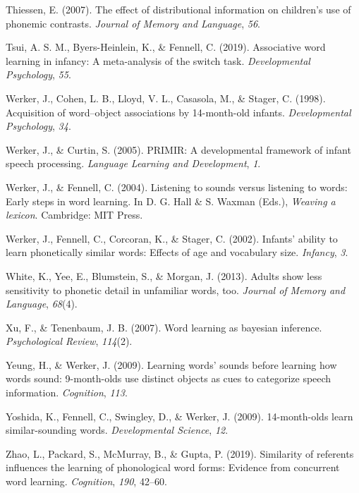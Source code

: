 \documentclass[english,,man]{apa6}
\begin{document}
\leavevmode\hypertarget{ref-thiessen2007}{}%
Thiessen, E. (2007). The effect of distributional information on children's use of phonemic contrasts. \emph{Journal of Memory and Language}, \emph{56}.

\leavevmode\hypertarget{ref-tsui2019}{}%
Tsui, A. S. M., Byers-Heinlein, K., \& Fennell, C. (2019). Associative word learning in infancy: A meta-analysis of the switch task. \emph{Developmental Psychology}, \emph{55}.

\leavevmode\hypertarget{ref-werker1998}{}%
Werker, J., Cohen, L. B., Lloyd, V. L., Casasola, M., \& Stager, C. (1998). Acquisition of word--object associations by 14-month-old infants. \emph{Developmental Psychology}, \emph{34}.

\leavevmode\hypertarget{ref-werker2005}{}%
Werker, J., \& Curtin, S. (2005). PRIMIR: A developmental framework of infant speech processing. \emph{Language Learning and Development}, \emph{1}.

\leavevmode\hypertarget{ref-werker2004}{}%
Werker, J., \& Fennell, C. (2004). Listening to sounds versus listening to words: Early steps in word learning. In D. G. Hall \& S. Waxman (Eds.), \emph{Weaving a lexicon}. Cambridge: MIT Press.

\leavevmode\hypertarget{ref-werker2002}{}%
Werker, J., Fennell, C., Corcoran, K., \& Stager, C. (2002). Infants' ability to learn phonetically similar words: Effects of age and vocabulary size. \emph{Infancy}, \emph{3}.

\leavevmode\hypertarget{ref-white2013}{}%
White, K., Yee, E., Blumstein, S., \& Morgan, J. (2013). Adults show less sensitivity to phonetic detail in unfamiliar words, too. \emph{Journal of Memory and Language}, \emph{68}(4).

\leavevmode\hypertarget{ref-xu2007}{}%
Xu, F., \& Tenenbaum, J. B. (2007). Word learning as bayesian inference. \emph{Psychological Review}, \emph{114}(2).

\leavevmode\hypertarget{ref-yeung09}{}%
Yeung, H., \& Werker, J. (2009). Learning words' sounds before learning how words sound: 9-month-olds use distinct objects as cues to categorize speech information. \emph{Cognition}, \emph{113}.

\leavevmode\hypertarget{ref-yoshida2009}{}%
Yoshida, K., Fennell, C., Swingley, D., \& Werker, J. (2009). 14-month-olds learn similar-sounding words. \emph{Developmental Science}, \emph{12}.

\leavevmode\hypertarget{ref-Zhao2019}{}%
Zhao, L., Packard, S., McMurray, B., \& Gupta, P. (2019). Similarity of referents influences the learning of phonological word forms: Evidence from concurrent word learning. \emph{Cognition}, \emph{190}, 42--60.
\end{document}
